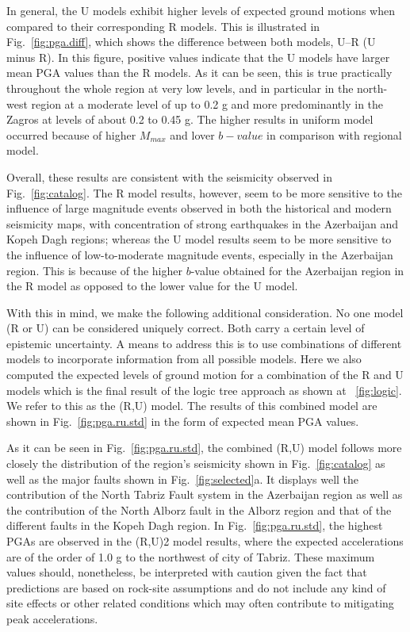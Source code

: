 In general, the U models exhibit higher levels of expected ground motions when compared to their corresponding R models. This is illustrated in Fig.~\ref{fig:pga.diff}, which shows the difference between both models, U--R (U minus R). In this figure, positive values indicate that the U models have larger mean PGA values than the R models. As it can be seen, this is true practically throughout the whole region at very low levels, and in particular in the north-west region at a moderate level of up to 0.2 g and more predominantly in the Zagros at levels of about 0.2 to 0.45 g. The higher results in uniform model occurred because of higher $M_{max}$ and lover $b-value$ in comparison with regional model.

Overall, these results are consistent with the seismicity observed in Fig.~\ref{fig:catalog}. The R model results, however, seem to be more sensitive to the influence of large magnitude events observed in both the historical and modern seismicity maps, with  concentration of strong earthquakes in the Azerbaijan and Kopeh Dagh regions; whereas the U model results seem to be more sensitive to the influence of low-to-moderate magnitude events, especially in the Azerbaijan region. This is because of the higher $b$-value obtained for the Azerbaijan region in the R model as opposed to the lower value for the U model.

With this in mind, we make the following additional consideration. No one model (R or U) can be considered uniquely correct. Both carry a certain level of epistemic uncertainty. A means to address this is to use combinations of different models to incorporate information from all possible models.  Here we also computed the expected levels of ground motion for a combination of the R and U models which is the final result of the logic tree approach as shown at ~\ref{fig:logic}. We refer to this as the (R,U) model. The results of this combined model are shown in Fig.~\ref{fig:pga.ru.std} in the form of expected mean PGA values.

As it can be seen in Fig.~\ref{fig:pga.ru.std}, the combined (R,U) model follows more closely the distribution of the region's seismicity shown in Fig.~\ref{fig:catalog} as well as the major faults shown in Fig.~\ref{fig:selected}a. It displays well the contribution of the North Tabriz Fault system in the Azerbaijan region as well as the contribution of the North Alborz fault in the Alborz region and that of the different faults in the Kopeh Dagh region. In Fig.~\ref{fig:pga.ru.std}, the highest PGAs are observed in the (R,U)2 model results, where the expected accelerations are of the order of 1.0 g to the northwest of  city of Tabriz. These maximum values should, nonetheless, be interpreted with caution given the fact that predictions are based on rock-site assumptions and do not include any kind of site effects or other related conditions which may often contribute to mitigating peak accelerations.

